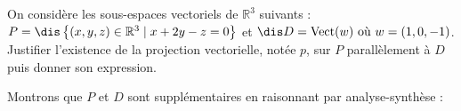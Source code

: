 \documentclass[a4paper,10pt]{report}
\begin{document}
\begin{ex} On considère les sous-espaces vectoriels de $\mathbb{R}^3 $ suivants : $P = \dis \left\{ {(x,y,z) \in \mathbb{R}^3 \mid x + 2y - z = 0} \right\}$ et $\dis D = \textrm{Vect} (w){\text{ o\`u }}w = (1,0, - 1)$. Justifier l'existence de la projection vectorielle, notée $p$, sur $P$ parallèlement à $D$ puis donner son expression.

\medskip

%

\noindent Montrons que $P$ et $D$ sont supplémentaires en raisonnant par analyse-synthèse :

%
%
%
%

\vspace{22cm}
\end{ex}
\end{document}
